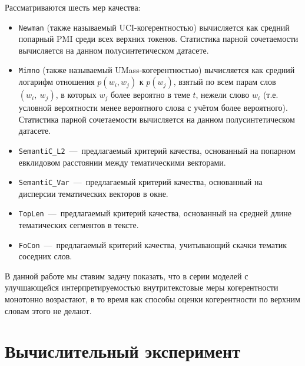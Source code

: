 Рассматриваются шесть мер качества: 
\begin{itemize}
    \item \texttt{Newman} (также называемый UCI-когерентностью) вычисляется как средний попарный PMI среди всех верхних токенов. Статистика парной сочетаемости вычисляется на данном полусинтетическом датасете.
    \item \texttt{Mimno} (также называемый UMass-когерентностью) вычисляется как средний логарифм отношения $p(w_i, w_j)$ к $p(w_j)$, взятый по всем парам слов $(w_i,~w_j)$, в которых $w_j$ более вероятно в теме $t$, нежели слово $w_i$ (т.е. условной вероятности менее вероятного слова с учётом более вероятного). Статистика парной сочетаемости вычисляется на данном полусинтетическом датасете. 
    \item  \texttt{SemantiC\_L2}~---~предлагаемый критерий качества, основанный на попарном евклидовом расстоянии между тематическими векторами.
    \item  \texttt{SemantiC\_Var}~---~предлагаемый критерий качества, основанный на дисперсии тематических векторов в окне.
    \item  \texttt{TopLen}~---~предлагаемый критерий качества, основанный на средней длине тематических сегментов в тексте.
    \item  \texttt{FoCon}~---~предлагаемый критерий качества, учитывающий скачки тематик соседних слов.
\end{itemize}

В данной работе мы ставим задачу показать, что в серии моделей с улучшающейся интерпретируемостью внутритекстовые меры когерентности монотонно возрастают, в то время как способы оценки когерентности по верхним словам этого не делают.

\section{Вычислительный эксперимент}

